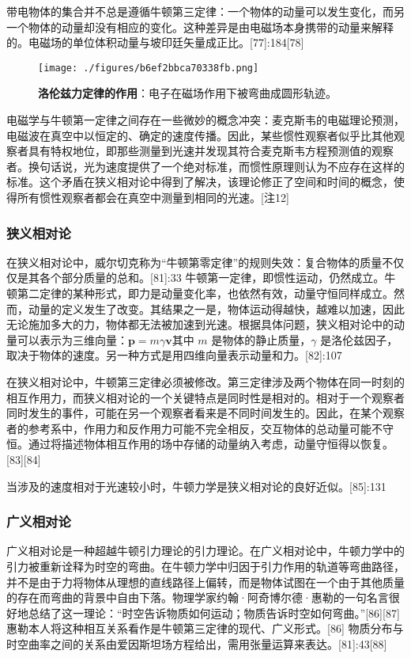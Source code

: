带电物体的集合并不总是遵循牛顿第三定律：一个物体的动量可以发生变化，而另一个物体的动量却没有相应的变化。这种差异是由电磁场本身携带的动量来解释的。电磁场的单位体积动量与坡印廷矢量成正比。[77]:184[78]
\begin{figure}[ht]
\centering
\texttt{[image: ./figures/b6ef2bbca70338fb.png]}
\caption{\textbf{洛伦兹力定律的作用}：电子在磁场作用下被弯曲成圆形轨迹。} \label{fig_NEW01_13}
\end{figure}
电磁学与牛顿第一定律之间存在一些微妙的概念冲突：麦克斯韦的电磁理论预测，电磁波在真空中以恒定的、确定的速度传播。因此，某些惯性观察者似乎比其他观察者具有特权地位，即那些测量到光速并发现其符合麦克斯韦方程预测值的观察者。换句话说，光为速度提供了一个绝对标准，而惯性原理则认为不应存在这样的标准。这个矛盾在狭义相对论中得到了解决，该理论修正了空间和时间的概念，使得所有惯性观察者都会在真空中测量到相同的光速。[注12]
\subsubsection{狭义相对论}  

在狭义相对论中，威尔切克称为“牛顿第零定律”的规则失效：复合物体的质量不仅仅是其各个部分质量的总和。[81]:33 牛顿第一定律，即惯性运动，仍然成立。牛顿第二定律的某种形式，即力是动量变化率，也依然有效，动量守恒同样成立。然而，动量的定义发生了改变。其结果之一是，物体运动得越快，越难以加速，因此无论施加多大的力，物体都无法被加速到光速。根据具体问题，狭义相对论中的动量可以表示为三维向量：\(\mathbf{p} = m\gamma \mathbf{v}\)其中 \( m \) 是物体的静止质量，\( \gamma \) 是洛伦兹因子，取决于物体的速度。另一种方式是用四维向量表示动量和力。[82]:107

在狭义相对论中，牛顿第三定律必须被修改。第三定律涉及两个物体在同一时刻的相互作用力，而狭义相对论的一个关键特点是同时性是相对的。相对于一个观察者同时发生的事件，可能在另一个观察者看来是不同时间发生的。因此，在某个观察者的参考系中，作用力和反作用力可能不完全相反，交互物体的总动量可能不守恒。通过将描述物体相互作用的场中存储的动量纳入考虑，动量守恒得以恢复。[83][84]

当涉及的速度相对于光速较小时，牛顿力学是狭义相对论的良好近似。[85]:131
\subsubsection{广义相对论}
广义相对论是一种超越牛顿引力理论的引力理论。在广义相对论中，牛顿力学中的引力被重新诠释为时空的弯曲。在牛顿力学中归因于引力作用的轨道等弯曲路径，并不是由于力将物体从理想的直线路径上偏转，而是物体试图在一个由于其他质量的存在而弯曲的背景中自由下落。物理学家约翰·阿奇博尔德·惠勒的一句名言很好地总结了这一理论：“时空告诉物质如何运动；物质告诉时空如何弯曲。”[86][87] 惠勒本人将这种相互关系看作是牛顿第三定律的现代、广义形式。[86] 物质分布与时空曲率之间的关系由爱因斯坦场方程给出，需用张量运算来表达。[81]:43[88]

